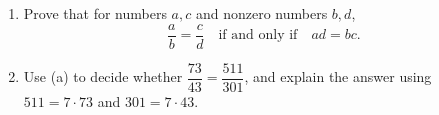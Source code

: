 \begin{enumerate}
\item[(a)] Prove that for numbers $a,c$ and nonzero numbers $b,d$,
\[\dfrac {a}{b}=\dfrac {c}{d}\quad\text{if and only if}\quad ad=bc.\]
\item[(b)] Use (a) to decide whether $\dfrac{73}{43}=\dfrac{511}{301}$, and explain the answer using $511=7\cdot73$ and $301=7\cdot43$.
\end{enumerate}
